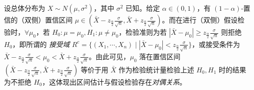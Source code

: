 \documentclass[../main.tex]{subfiles}
\begin{document}
\begin{example}
    设总体分布为 $X\sim N(\mu,\sigma^2)$，其中 $\sigma^2$ 已知。给定 $\alpha\in(0,1)$，有 $(1-\alpha)$-置信的（双侧）置信区间 $\mu\in(\bar X-z_{\frac\alpha 2}\frac\sigma{\sqrt n},\bar X+z_{\frac\alpha 2}\frac\sigma{\sqrt n})$。而在进行（双侧）假设检验时，$\forall\mu_0$，若 $H_0:\mu=\mu_0,H_1:\mu\neq\mu_0$，检验准则为若 $|\bar X-\mu_0|\geq z_{\frac\alpha 2}\frac\sigma{\sqrt n}$ 则拒绝 $H_0$，即所谓的 \emph{接受域} $R^c=\{(X_1,\cdots,X_n)\mid|\bar X-\mu_0|<z_{\frac\alpha 2}\frac\sigma{\sqrt n}\}$，或接受条件为 $\bar X-z_{\frac\alpha 2}\frac\sigma{\sqrt n}<\mu_0<\bar X+z_{\frac\alpha 2}\frac\sigma{\sqrt n}$。由此可见，$\mu_0$ 落在置信区间 $(\bar X-z_{\frac\alpha 2}\frac\sigma{\sqrt n},\bar X+z_{\frac\alpha 2}\frac\sigma{\sqrt n})$ 等价于用 $\bar X$ 作为检验统计量检验上述 $H_0,H_1$ 时的结果为不拒绝 $H_0$，这体现出区间估计与假设检验存在\emph{对偶关系}。
\end{example}
\end{document}
